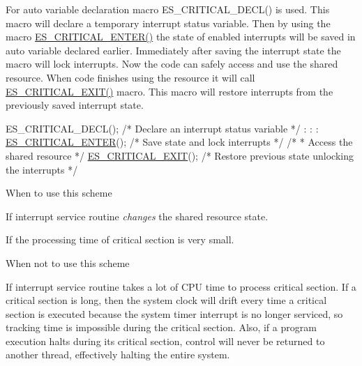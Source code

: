 For {\ttfamily auto} variable declaration macro E\-S\-\_\-\-C\-R\-I\-T\-I\-C\-A\-L\-\_\-\-D\-E\-C\-L() is used. This macro will declare a temporary interrupt status variable. Then by using the macro \hyperlink{group__kern__intf_ga90ec47263e8a05b91fe9359c97eb1c9c}{E\-S\-\_\-\-C\-R\-I\-T\-I\-C\-A\-L\-\_\-\-E\-N\-T\-E\-R()} the state of enabled interrupts will be saved in {\ttfamily auto} variable declared earlier. Immediately after saving the interrupt state the macro will lock interrupts. Now the code can safely access and use the shared resource. When code finishes using the resource it will call \hyperlink{group__kern__intf_gade4fcc55ee1325723ed798a8c5e11e56}{E\-S\-\_\-\-C\-R\-I\-T\-I\-C\-A\-L\-\_\-\-E\-X\-I\-T()} macro. This macro will restore interrupts from the previously saved interrupt state.


\begin{DoxyCode}
ES\_CRITICAL\_DECL();                 \textcolor{comment}{/* Declare an interrupt status variable */}
    :
    :
    :   
\hyperlink{group__kern__intf_ga90ec47263e8a05b91fe9359c97eb1c9c}{ES\_CRITICAL\_ENTER}();                \textcolor{comment}{/* Save state and lock interrupts */}
\textcolor{comment}{/*}
\textcolor{comment}{ * Access the shared resource}
\textcolor{comment}{ */}
\hyperlink{group__kern__intf_gade4fcc55ee1325723ed798a8c5e11e56}{ES\_CRITICAL\_EXIT}();                 \textcolor{comment}{/* Restore previous state unlocking the interrupts */}
\end{DoxyCode}
 \begin{DoxyParagraph}{When to use this scheme}

\begin{DoxyItemize}
\item If interrupt service routine {\itshape changes} the shared resource state.
\item If the processing time of critical section is very small.
\end{DoxyItemize}
\end{DoxyParagraph}
\begin{DoxyParagraph}{When not to use this scheme}

\begin{DoxyItemize}
\item If interrupt service routine takes a lot of C\-P\-U time to process critical section. If a critical section is long, then the system clock will drift every time a critical section is executed because the system timer interrupt is no longer serviced, so tracking time is impossible during the critical section. Also, if a program execution halts during its critical section, control will never be returned to another thread, effectively halting the entire system.
\end{DoxyItemize}
\end{DoxyParagraph}
